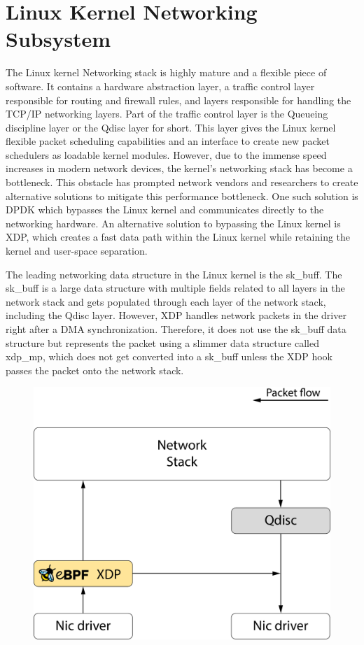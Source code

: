 \documentclass[sigconf, nonacm]{acmart}
\begin{document}
\section{Linux Kernel Networking Subsystem}

The Linux kernel Networking stack is highly mature and a flexible piece of software. It contains a hardware abstraction layer, a traffic control layer responsible for routing and firewall rules, and layers responsible for handling the TCP/IP networking layers. Part of the traffic control layer is the Queueing discipline layer or the Qdisc layer for short. This layer gives the Linux kernel flexible packet scheduling capabilities and an interface to create new packet schedulers as loadable kernel modules. However, due to the immense speed increases in modern network devices, the kernel's networking stack has become a bottleneck. This obstacle has prompted network vendors and researchers to create alternative solutions to mitigate this performance bottleneck. One such solution is DPDK which bypasses the Linux kernel and communicates directly to the networking hardware. An alternative solution to bypassing the Linux kernel is XDP, which creates a fast data path within the Linux kernel while retaining the kernel and user-space separation.

The leading networking data structure in the Linux kernel is the sk\_buff. The sk\_buff is a large data structure with multiple fields related to all layers in the network stack and gets populated through each layer of the network stack, including the Qdisc layer. However, XDP handles network packets in the driver right after a DMA synchronization. Therefore, it does not use the sk\_buff data structure but represents the packet using a slimmer data structure called xdp\_mp, which does not get converted into a sk\_buff unless the XDP hook passes the packet onto the network stack.

\begin{figure}
  \includegraphics[width=\linewidth]{network-overview.pdf}
  \caption{\label{fig:network_overview}}
\end{figure}
\end{document}

